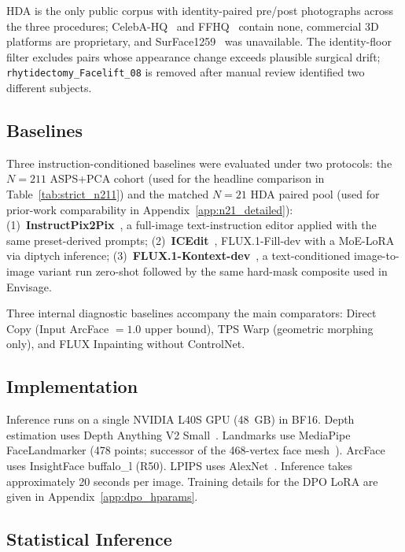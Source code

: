 \documentclass{article}
\newcommand{\method}{Envisage}
\begin{document}
HDA is the only public corpus with identity-paired pre/post photographs across
the three procedures; CelebA-HQ~\citep{karras2018celebahq} and
FFHQ~\citep{karras2019ffhq} contain none, commercial 3D platforms are
proprietary, and SurFace1259~\citep{varghaei2025surface} was unavailable.
The identity-floor filter excludes pairs whose appearance change exceeds
plausible surgical drift; \texttt{rhytidectomy\_Facelift\_08} is removed
after manual review identified two different subjects.

\subsection{Baselines}

Three instruction-conditioned baselines were evaluated under two protocols: the $N{=}211$ ASPS+PCA cohort (used for the headline comparison in Table~\ref{tab:strict_n211}) and the matched $N{=}21$ HDA paired pool (used for prior-work comparability in Appendix~\ref{app:n21_detailed}): (1)~\textbf{InstructPix2Pix}~\citep{brooks2023instructpix2pix},
a full-image text-instruction editor applied with the same preset-derived
prompts; (2)~\textbf{ICEdit}~\citep{zhang2025icedit}, FLUX.1-Fill-dev with a
MoE-LoRA via diptych inference; (3)~\textbf{FLUX.1-Kontext-dev}~\citep{flux_kontext_2025},
a text-conditioned image-to-image variant run zero-shot followed by the same
hard-mask composite used in \method{}.

Three internal diagnostic baselines accompany the main comparators: Direct Copy
(Input ArcFace $=1.0$ upper bound), TPS Warp (geometric morphing only), and
FLUX Inpainting without ControlNet.

\subsection{Implementation}

Inference runs on a single NVIDIA L40S GPU (48~GB) in BF16. Depth estimation
uses Depth Anything V2 Small~\citep{yang2024depth}. Landmarks use MediaPipe FaceLandmarker
(478 points; successor of the 468-vertex face mesh~\citep{kartynnik2019mediapipe}). ArcFace uses InsightFace buffalo\_l
(R50). LPIPS uses AlexNet~\citep{zhang2018lpips}. Inference takes approximately
20 seconds per image. Training details for the DPO LoRA are given in
Appendix~\ref{app:dpo_hparams}.

\subsection{Statistical Inference}
\end{document}

